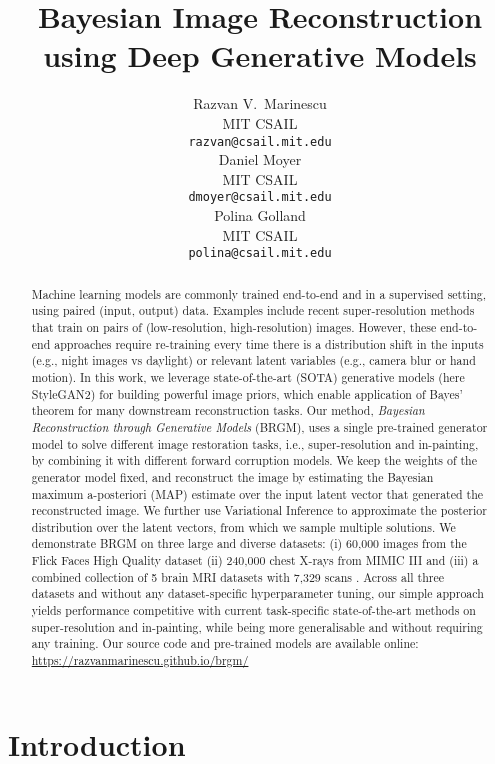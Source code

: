 \documentclass{article}
\title{Bayesian Image Reconstruction using Deep Generative Models}
\author{Razvan V.~Marinescu\\MIT CSAIL\\
  \texttt{razvan@csail.mit.edu} \\
  \And
  Daniel Moyer \\
  MIT CSAIL \\
  \texttt{dmoyer@csail.mit.edu} \\
  \AND
  Polina Golland \\
  MIT CSAIL \\
  \texttt{polina@csail.mit.edu} \\
}
\begin{document}
\maketitle

\begin{abstract}
Machine learning models are commonly trained end-to-end and in a supervised setting, using paired (input, output) data. Examples include recent super-resolution methods that train on pairs of (low-resolution, high-resolution) images. However, these end-to-end approaches require re-training every time there is a distribution shift in the inputs (e.g., night images vs daylight) or relevant latent variables (e.g., camera blur or hand motion). In this work, we leverage state-of-the-art (SOTA) generative models (here StyleGAN2) for building powerful image priors, which enable application of Bayes' theorem for many downstream reconstruction tasks. Our method, \emph{Bayesian Reconstruction through Generative Models} (BRGM), uses a single pre-trained generator model to solve different image restoration tasks, i.e., super-resolution and in-painting, by combining it with different forward corruption models. We keep the weights of the generator model fixed, and reconstruct the image by estimating the Bayesian maximum a-posteriori (MAP) estimate over the input latent vector that generated the reconstructed image. We further use Variational Inference to approximate the posterior distribution over the latent vectors, from which we sample multiple solutions. We demonstrate BRGM on three large and diverse datasets: (i) 60,000 images from the Flick Faces High Quality dataset \cite{karras2019style} (ii) 240,000 chest X-rays from MIMIC III \cite{johnson2016mimic} and (iii) a combined collection of 5 brain MRI datasets with 7,329 scans \cite{dalca2018anatomical}. Across all three datasets and without any dataset-specific hyperparameter tuning, our simple approach yields performance competitive with current task-specific state-of-the-art methods on super-resolution and in-painting, while being more generalisable and without requiring any training. Our source code and pre-trained models are available online: \url{https://razvanmarinescu.github.io/brgm/}
\end{abstract}




\section{Introduction}
\end{document}
